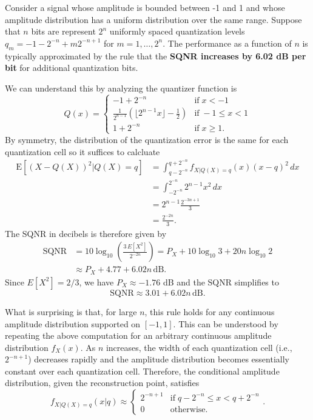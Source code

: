 \begin{example}
Consider a signal whose amplitude is bounded between -1 and 1 and whose amplitude distribution has a uniform distribution over the same range.
Suppose that $n$ bits are represent $2^n$ uniformly spaced quantization levels $q_m = -1-2^{-n} + m 2^{-n+1}$ for $m=1,\ldots,2^n$.
The performance as a function of $n$ is typically approximated by the rule that the \textbf{SQNR increases by 6.02 dB per bit} for additional quantization bits.

We can understand this by analyzing the quantizer function is
\[ Q(x) =
\begin{cases}
-1+2^{-n} & \mathrm{if} \; x < -1 \\
\frac{1}{2^{n-1}} \left( \lfloor 2^{n-1} x \rfloor - \frac{1}{2} \right) & \mathrm{if} \; - 1 \leq x < 1 \\
1+2^{-n} & \mathrm{if} \; x \geq 1.
\end{cases}
\]
By symmetry, the distribution of the quantization error is the same for each quantization cell so it suffices to calcluate
\begin{align*}
\mathrm{E} \left[ \left( X - Q(X) \right)^2 \big| Q(X)=q \right]
&= \int_{q-2^{-n}}^{q+2^{-n}} f_{X|Q(X)=q} (x) (x-q)^2 \, dx \\
&= \int_{-2^{-n}}^{2^{-n}} 2^{n-1} x^2 \, dx \\
&= 2^{n-1} \frac{2^{-3n+1}}{3} \\
&= \frac{2^{-2n}}{3}.
\end{align*}
The SQNR in decibels is therefore given by
\begin{align*}
\text{SQNR} &= 10 \log_{10} \left( \frac{3\,E[X^2]}{2^{-2n}} \right)
= P_X + 10 \log_{10} 3 + 20n \log_{10} 2 \\
& \approx P_X + 4.77 + 6.02 n \, \text{dB}.
\end{align*}
Since $E[X^2] = 2/3$, we have $P_X \approx -1.76$ dB and the SQNR simplifies to
\[ \text{SQNR} \approx 3.01 + 6.02 n \, \text{dB}. \]
\end{example}

What is surprising is that, for large $n$, this rule holds for any continuous amplitude distribution supported on $[-1,1]$.
This can be understood by repeating the above computation for an arbitrary continuous amplitude distribution $f_X (x)$.
As $n$ increases, the width of each quantization cell (i.e., $2^{-n+1}$) decreases rapidly and the amplitude distribution becomes essentially constant over each quantization cell.
Therefore, the conditional amplitude distribution, given the reconstruction point, satisfies
\[ f_{X|Q(X)=q} (x|q) \approx \begin{cases} 2^{-n+1} & \mathrm{if}\; q-2^{-n} \leq x < q+2^{-n} \\ 0 & \mathrm{otherwise.} \end{cases}. \]

